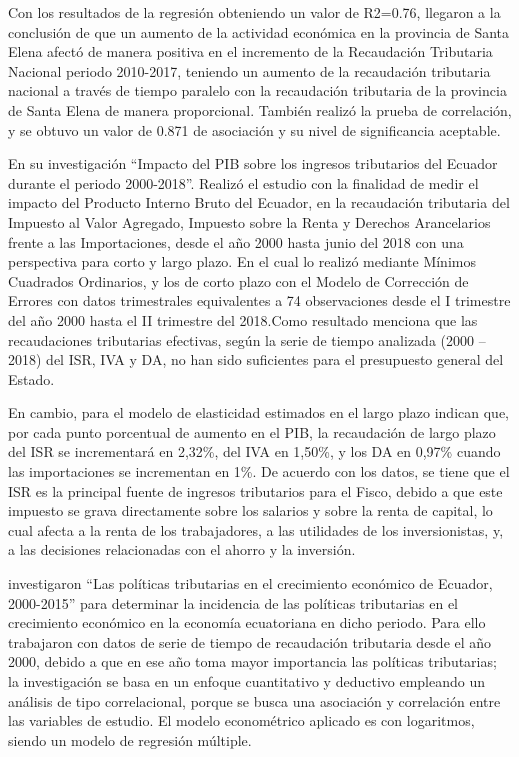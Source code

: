 \documentclass[
  letterpaper,
  DIV=11,
  numbers=noendperiod]{scrartcl}
\begin{document}
Con los resultados de la regresión obteniendo un valor de R2=0.76,
llegaron a la conclusión de que un aumento de la actividad económica en
la provincia de Santa Elena afectó de manera positiva en el incremento
de la Recaudación Tributaria Nacional periodo 2010-2017, teniendo un
aumento de la recaudación tributaria nacional a través de tiempo
paralelo con la recaudación tributaria de la provincia de Santa Elena de
manera proporcional. También realizó la prueba de correlación, y se
obtuvo un valor de 0.871 de asociación y su nivel de significancia
aceptable.

\textcite{benitez_impacto_2019} En su investigación ``Impacto del PIB
sobre los ingresos tributarios del Ecuador durante el periodo
2000-2018''. Realizó el estudio con la finalidad de medir el impacto del
Producto Interno Bruto del Ecuador, en la recaudación tributaria del
Impuesto al Valor Agregado, Impuesto sobre la Renta y Derechos
Arancelarios frente a las Importaciones, desde el año 2000 hasta junio
del 2018 con una perspectiva para corto y largo plazo. En el cual lo
realizó mediante Mínimos Cuadrados Ordinarios, y los de corto plazo con
el Modelo de Corrección de Errores con datos trimestrales equivalentes a
74 observaciones desde el I trimestre del año 2000 hasta el II trimestre
del 2018.Como resultado menciona que las recaudaciones tributarias
efectivas, según la serie de tiempo analizada (2000 -- 2018) del ISR,
IVA y DA, no han sido suficientes para el presupuesto general del
Estado.

En cambio, para el modelo de elasticidad estimados en el largo plazo
indican que, por cada punto porcentual de aumento en el PIB, la
recaudación de largo plazo del ISR se incrementará en 2,32\%, del IVA en
1,50\%, y los DA en 0,97\% cuando las importaciones se incrementan en
1\%. De acuerdo con los datos, se tiene que el ISR es la principal
fuente de ingresos tributarios para el Fisco, debido a que este impuesto
se grava directamente sobre los salarios y sobre la renta de capital, lo
cual afecta a la renta de los trabajadores, a las utilidades de los
inversionistas, y, a las decisiones relacionadas con el ahorro y la
inversión.

\textcite{nina_politicas_2017} investigaron ``Las políticas tributarias
en el crecimiento económico de Ecuador, 2000-2015'' para determinar la
incidencia de las políticas tributarias en el crecimiento económico en
la economía ecuatoriana en dicho periodo. Para ello trabajaron con datos
de serie de tiempo de recaudación tributaria desde el año 2000, debido a
que en ese año toma mayor importancia las políticas tributarias; la
investigación se basa en un enfoque cuantitativo y deductivo empleando
un análisis de tipo correlacional, porque se busca una asociación y
correlación entre las variables de estudio. El modelo econométrico
aplicado es con logaritmos, siendo un modelo de regresión múltiple.
\end{document}

